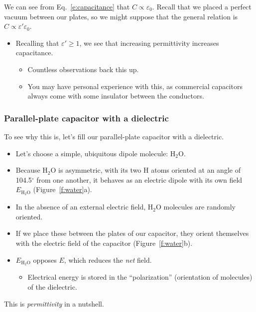 \documentclass[11pt, oneside]{article}
\begin{document}
We can see from Eq.~\eqref{e:capacitance} that $C \propto \varepsilon_0$. Recall that we placed a perfect vacuum between our plates, so we might suppose that the general relation is $C \propto \varepsilon'\varepsilon_0$.
\begin{itemize}
	\item Recalling that $\varepsilon' \ge 1$, we see that increasing permittivity increases capacitance.
	\begin{itemize}
		\item Countless observations back this up.
		\item You may have personal experience with this, as commercial capacitors always come with some insulator between the conductors.
	\end{itemize}
\end{itemize}

\subsubsection{Parallel-plate capacitor with a dielectric}

To see why this is, let's fill our parallel-plate capacitor with a dielectric.
\begin{itemize}
	\item Let's choose a simple, ubiquitous dipole molecule: H$_2$O.
	\item Because H$_2$O is asymmetric, with its two H atoms oriented at an angle of 104.5$^\circ$ from one another, it behaves as an electric dipole with its own field $E_{\mathrm{H_2O}}$ (Figure~\ref{f:water}a).
	\item In the absence of an external electric field, H$_2$O molecules are randomly oriented.
	\item If we place these between the plates of our capacitor, they orient themselves with the electric field of the capacitor (Figure~\ref{f:water}b).
	\item $E_{\mathrm{H_2O}}$ opposes $E$, which reduces the \emph{net} field.
	\begin{itemize}
		\item Electrical energy is stored in the ``polarization'' (orientation of molecules) of the dielectric.
	\end{itemize}
\end{itemize}
This is \emph{permittivity} in a nutshell.
\end{document}
